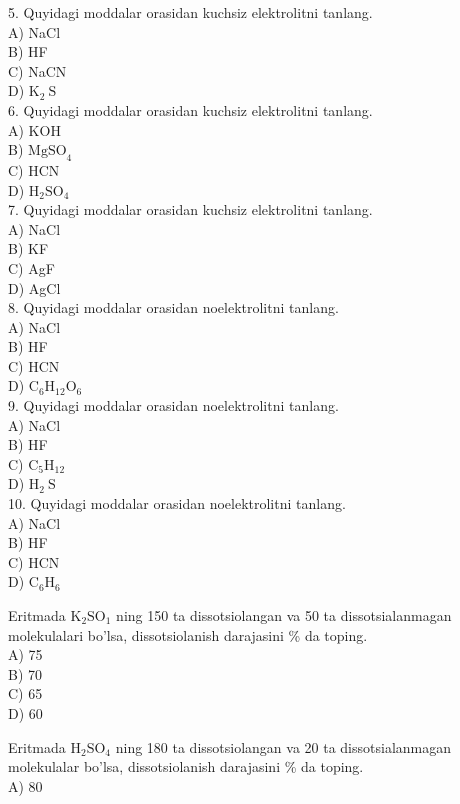 5. Quyidagi moddalar orasidan kuchsiz elektrolitni tanlang.\\
A) NaCl\\
B) HF\\
C) NaCN\\
D) $\mathrm{K}_{2} \mathrm{~S}$\\
6. Quyidagi moddalar orasidan kuchsiz elektrolitni tanlang.\\
A) KOH\\
B) $\mathrm{MgSO}_{4}$\\
C) HCN\\
D) $\mathrm{H}_{2} \mathrm{SO}_{4}$\\
7. Quyidagi moddalar orasidan kuchsiz elektrolitni tanlang.\\
A) NaCl\\
B) KF\\
C) AgF\\
D) AgCl\\
8. Quyidagi moddalar orasidan noelektrolitni tanlang.\\
A) NaCl\\
B) HF\\
C) HCN\\
D) $\mathrm{C}_{6} \mathrm{H}_{12} \mathrm{O}_{6}$\\
9. Quyidagi moddalar orasidan noelektrolitni tanlang.\\
A) NaCl\\
B) HF\\
C) $\mathrm{C}_{5} \mathrm{H}_{12}$\\
D) $\mathrm{H}_{2} \mathrm{~S}$\\
10. Quyidagi moddalar orasidan noelektrolitni tanlang.\\
A) NaCl\\
B) HF\\
C) HCN\\
D) $\mathrm{C}_{6} \mathrm{H}_{6}$
  \item Eritmada $\mathrm{K}_{2} \mathrm{SO}_{1}$ ning 150 ta dissotsiolangan va 50 ta dissotsialanmagan molekulalari bo'lsa, dissotsiolanish darajasini \% da toping.\\
A) 75\\
B) 70\\
C) 65\\
D) 60
  \item Eritmada $\mathrm{H}_{2} \mathrm{SO}_{4}$ ning 180 ta dissotsiolangan va 20 ta dissotsialanmagan molekulalar bo'lsa, dissotsiolanish darajasini \% da toping.\\
A) 80\\
